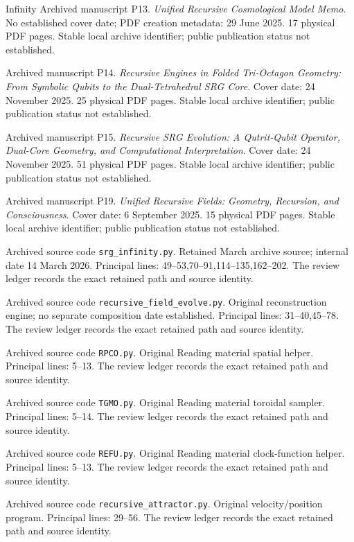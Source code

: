 \documentclass[11pt,a4paper]{article}
\theoremstyle{definition}
\numberwithin{equation}{section}
\begin{document}
\begin{thebibliography}{Infinity}
Archived manuscript P13.
\emph{Unified Recursive Cosmological Model Memo}.
No established cover date; PDF creation metadata: 29 June 2025. 17 physical PDF pages.
Stable local archive identifier; public publication status not established.

Archived manuscript P14.
\emph{Recursive Engines in Folded Tri-Octagon Geometry: From Symbolic Qubits to the Dual-Tetrahedral SRG Core}.
Cover date: 24 November 2025. 25 physical PDF pages.
Stable local archive identifier; public publication status not established.

Archived manuscript P15.
\emph{Recursive SRG Evolution: A Qutrit-Qubit Operator, Dual-Core Geometry, and Computational Interpretation}.
Cover date: 24 November 2025. 51 physical PDF pages.
Stable local archive identifier; public publication status not established.

Archived manuscript P19.
\emph{Unified Recursive Fields: Geometry, Recursion, and Consciousness}.
Cover date: 6 September 2025. 15 physical PDF pages.
Stable local archive identifier; public publication status not established.

Archived source code \texttt{srg\_infinity.py}.
Retained March archive source; internal date 14 March 2026. Principal lines: 49--53,70--91,114--135,162--202.
The review ledger records the exact retained path and source identity.

Archived source code \texttt{recursive\_field\_evolve.py}.
Original reconstruction engine; no separate composition date established. Principal lines: 31--40,45--78.
The review ledger records the exact retained path and source identity.

Archived source code \texttt{RPCO.py}.
Original Reading material spatial helper. Principal lines: 5--13.
The review ledger records the exact retained path and source identity.

Archived source code \texttt{TGMO.py}.
Original Reading material toroidal sampler. Principal lines: 5--14.
The review ledger records the exact retained path and source identity.

Archived source code \texttt{REFU.py}.
Original Reading material clock-function helper. Principal lines: 5--13.
The review ledger records the exact retained path and source identity.

Archived source code \texttt{recursive\_attractor.py}.
Original velocity/position program. Principal lines: 29--56.
The review ledger records the exact retained path and source identity.


\end{thebibliography}
\end{document}
